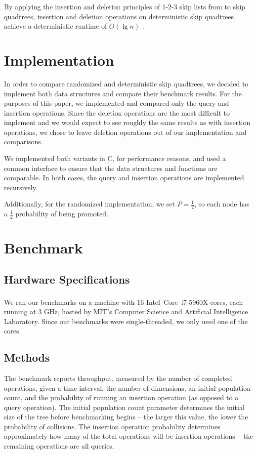 \documentclass[12pt]{article}
\begin{document}
        By applying the insertion and deletion principles of 1-2-3 skip lists from \cite{dsl} to skip quadtrees, insertion and deletion operations on deterministic skip quadtrees achieve a deterministic runtime of $O(\lg n)$ \cite{sqt}.
    
    \section{Implementation}
        In order to compare randomized and deterministic skip quadtrees, we decided to implement both data structures and compare their benchmark results. For the purposes of this paper, we implemented and compared only the query and insertion operations. Since the deletion operations are the most difficult to implement and we would expect to see roughly the same results as with insertion operations, we chose to leave deletion operations out of our implementation and comparisons.
        
        We implemented both variants in C, for performance reasons, and used a common interface to ensure that the data structures and functions are comparable. In both cases, the query and insertion operations are implemented recursively.
        
        Additionally, for the randomized implementation, we set $P = \frac{1}{2}$, so each node has a $\frac{1}{2}$ probability of being promoted.
    
    \section{Benchmark}
    \subsection{Hardware Specifications}
        We ran our benchmarks on a machine with 16 Intel\textsuperscript\textregistered\ Core\textsuperscript\texttrademark\ i7-5960X cores, each running at 3 GHz, hosted by MIT's Computer Science and Artificial Intelligence Laboratory. Since our benchmarks were single-threaded, we only used one of the cores.
    
    \subsection{Methods}
        The benchmark reports throughput, measured by the number of completed operations, given a time interval, the number of dimensions, an initial population count, and the probability of running an insertion operation (as opposed to a query operation). The initial population count parameter determines the initial size of the tree before benchmarking begins -- the larger this value, the lower the probability of collisions. The insertion operation probability determines approximately how many of the total operations will be insertion operations -- the remaining operations are all queries.
        
\end{document}
